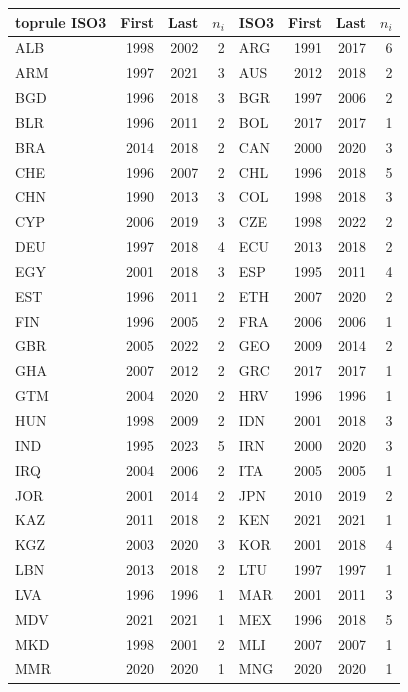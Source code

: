 \documentclass[11pt]{article}
\begin{document}
\begin{table}[!t]
\begin{tabular*}{\linewidth}{@{\extracolsep{\fill}}lrrr@{\hspace{1.5em}}lrrr@{}}
\csname toprule\endcsname
ISO3 & First & Last & $n_i$ & ISO3 & First & Last & $n_i$ \\
\midrule
ALB & 1998 & 2002 & 2 & ARG & 1991 & 2017 & 6 \\
ARM & 1997 & 2021 & 3 & AUS & 2012 & 2018 & 2 \\
BGD & 1996 & 2018 & 3 & BGR & 1997 & 2006 & 2 \\
BLR & 1996 & 2011 & 2 & BOL & 2017 & 2017 & 1 \\
BRA & 2014 & 2018 & 2 & CAN & 2000 & 2020 & 3 \\
CHE & 1996 & 2007 & 2 & CHL & 1996 & 2018 & 5 \\
CHN & 1990 & 2013 & 3 & COL & 1998 & 2018 & 3 \\
CYP & 2006 & 2019 & 3 & CZE & 1998 & 2022 & 2 \\
DEU & 1997 & 2018 & 4 & ECU & 2013 & 2018 & 2 \\
EGY & 2001 & 2018 & 3 & ESP & 1995 & 2011 & 4 \\
EST & 1996 & 2011 & 2 & ETH & 2007 & 2020 & 2 \\
FIN & 1996 & 2005 & 2 & FRA & 2006 & 2006 & 1 \\
GBR & 2005 & 2022 & 2 & GEO & 2009 & 2014 & 2 \\
GHA & 2007 & 2012 & 2 & GRC & 2017 & 2017 & 1 \\
GTM & 2004 & 2020 & 2 & HRV & 1996 & 1996 & 1 \\
HUN & 1998 & 2009 & 2 & IDN & 2001 & 2018 & 3 \\
IND & 1995 & 2023 & 5 & IRN & 2000 & 2020 & 3 \\
IRQ & 2004 & 2006 & 2 & ITA & 2005 & 2005 & 1 \\
JOR & 2001 & 2014 & 2 & JPN & 2010 & 2019 & 2 \\
KAZ & 2011 & 2018 & 2 & KEN & 2021 & 2021 & 1 \\
KGZ & 2003 & 2020 & 3 & KOR & 2001 & 2018 & 4 \\
LBN & 2013 & 2018 & 2 & LTU & 1997 & 1997 & 1 \\
LVA & 1996 & 1996 & 1 & MAR & 2001 & 2011 & 3 \\
MDV & 2021 & 2021 & 1 & MEX & 1996 & 2018 & 5 \\
MKD & 1998 & 2001 & 2 & MLI & 2007 & 2007 & 1 \\
MMR & 2020 & 2020 & 1 & MNG & 2020 & 2020 & 1 \\

\end{tabular*}
\end{table}
\end{document}
